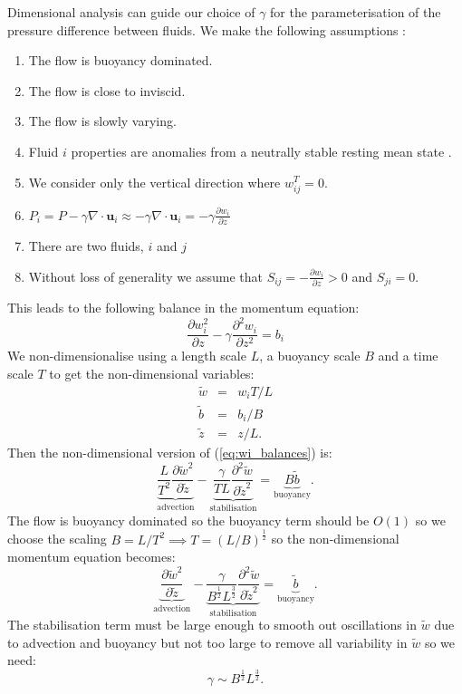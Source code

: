 \documentclass[draft]{agujournal2019}
\begin{document}
Dimensional analysis can guide our choice of $\gamma$ for the parameterisation of the pressure difference between fluids. We make the following assumptions
:
\begin{enumerate}
\item The flow is buoyancy dominated.
\item The flow is close to inviscid.
\item The flow is slowly varying.
\item Fluid $i$ properties are anomalies from a neutrally stable resting
mean state 
.
\item We consider only the vertical direction where $w_{ij}^{T}=0$.
\item $P_{i}=P-\gamma\nabla\cdot\mathbf{u}_{i}\approx-\gamma\nabla\cdot\mathbf{u}_{i}=-\gamma\frac{\partial w_{i}}{\partial z}$
\item There are two fluids, $i$ and $j$
\item Without loss of generality we assume that $S_{ij}=-\frac{\partial w_{i}}{\partial z}>0$
and $S_{ji}=0$.
\end{enumerate}
This leads to the following balance in the momentum equation:
\begin{equation}
\frac{\partial w_{i}^{2}}{\partial z}-\gamma\frac{\partial^{2}w_{i}}{\partial z^{2}}=b_{i}\label{eq:wi_balances}
\end{equation}
We non-dimensionalise using a length scale $L$, a buoyancy scale
$B$ and a time scale $T$ to get the non-dimensional variables:
\begin{eqnarray*}
\tilde{w} & = & w_{i}T/L\\
\tilde{b} & = & b_{i}/B\\
\tilde{z} & = & z/L.
\end{eqnarray*}
Then the non-dimensional version of (\ref{eq:wi_balances}) is:
\begin{equation}
\underbrace{{\frac{L}{T^{2}}\frac{\partial\tilde{w}^{2}}{\partial\tilde{z}}}}_{\text{advection}}-\underbrace{{\frac{\gamma}{TL}\frac{\partial^{2}\tilde{w}}{\partial\tilde{z}^{2}}}}_{\text{stabilisation}}=\underbrace{B\tilde{b}}_{\text{buoyancy}}.\label{eq:wi_nonDomTmp}
\end{equation}
The flow is buoyancy dominated so the buoyancy term should be $O(1)$
so we choose the scaling $B=L/T^{2}\implies T=(L/B)^{\frac{1}{2}}$
so the non-dimensional momentum equation becomes:
\begin{equation}
\underbrace{{\frac{\partial\tilde{w}^{2}}{\partial\tilde{z}}}}_{\text{advection}}-\underbrace{{\frac{\gamma}{B^{\frac{1}{2}}L^{\frac{3}{2}}}\frac{\partial^{2}\tilde{w}}{\partial\tilde{z}^{2}}}}_{\text{stabilisation}}=\underbrace{\tilde{b}}_{\text{buoyancy}}.\label{eq:wi_nonDom-1}
\end{equation}
The stabilisation term must be large enough to smooth out oscillations
in $\tilde{w}$ due to advection and buoyancy but not too large to
remove all variability in $\tilde{w}$ so we need:
\begin{equation}
\gamma\sim B^{\frac{1}{2}}L^{\frac{3}{2}}.\label{eq:gammaDimAnal}
\end{equation}
\end{document}
